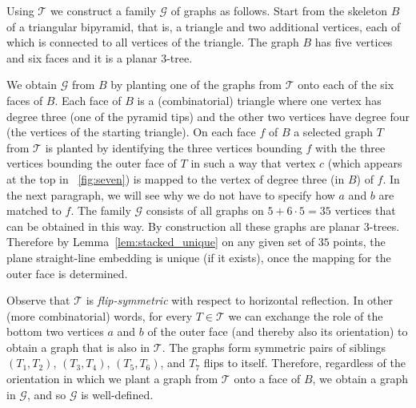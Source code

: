 \documentclass[11pt]{article}
\begin{document}
Using $\mathcal{T}$ we construct a family $\mathcal{G}$ of graphs as follows.
Start from the skeleton $B$ of a triangular bipyramid, that is, a triangle and
two additional vertices, each of which is connected to all vertices of the
triangle. The graph $B$ has five vertices and six faces and it is a planar
3-tree.

We obtain $\mathcal{G}$ from $B$ by planting one of the graphs from
$\mathcal{T}$ onto each of the six faces of $B$. Each face of $B$ is a
(combinatorial) triangle where one vertex has degree three (one of the pyramid
tips) and the other two vertices have degree four (the vertices of the starting
triangle). On each face $f$ of $B$ a selected graph $T$ from $\mathcal{T}$ is
planted by identifying the three vertices bounding $f$ with the three vertices
bounding the outer face of $T$ in such a way that vertex $c$ (which appears at
the top in \figurename~\ref{fig:seven}) is mapped to the vertex of degree three
(in $B$) of $f$. In the next paragraph, we will see why we do not have to
specify how $a$ and $b$ are matched to $f$. The family $\mathcal{G}$ consists of
all graphs on $5+6\cdot 5=35$ vertices that can be obtained in this way. By
construction all these graphs are planar 3-trees. Therefore by
Lemma~\ref{lem:stacked_unique} on any given set of $35$ points, the plane
straight-line embedding is unique (if it exists), once the mapping for the outer
face is determined.

Observe that $\mathcal{T}$ is \emph{flip-symmetric} with respect to horizontal
reflection. In other (more combinatorial) words, for every $T\in\mathcal{T}$ we
can exchange the role of the bottom two vertices $a$ and $b$ of the outer face
(and thereby also its orientation) to obtain a graph that is also in
$\mathcal{T}$. The graphs form symmetric pairs of siblings $(T_1,T_2)$,
$(T_3,T_4)$, $(T_5,T_6)$, and $T_7$ flips to itself. Therefore, regardless of
the orientation in which we plant a graph from $\mathcal{T}$ onto a face of $B$,
we obtain a graph in $\mathcal{G}$, and so $\mathcal{G}$ is well-defined.
\end{document}
